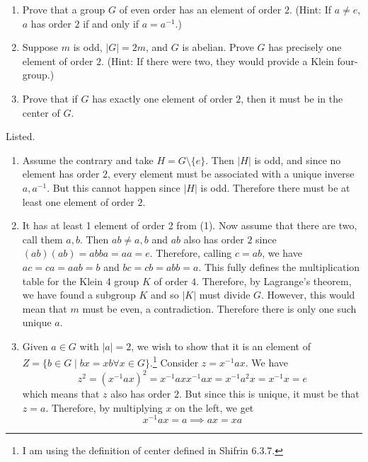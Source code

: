   \begin{exercise}[Shifrin 6.3.17]
    \begin{enumerate}
      \item Prove that a group $G$ of even order has an element of order $2$. (Hint: If $a \neq e$, $a$ has order $2$ if and only if $a = a^{-1}$.)
      \item Suppose $m$ is odd, $|G| = 2m$, and $G$ is abelian. Prove $G$ has precisely one element of order $2$. (Hint: If there were two, they would provide a Klein four-group.)
      \item Prove that if $G$ has exactly one element of order $2$, then it must be in the center of $G$.
    \end{enumerate}
  \end{exercise}
  \begin{solution}
    Listed. 
    \begin{enumerate}
      \item Assume the contrary and take $H = G \setminus \{e\}$. Then $|H|$ is odd, and since no element has order $2$, every element must be associated with a unique inverse $a, a^{-1}$. But this cannot happen since $|H|$ is odd. Therefore there must be at least one element of order $2$. 

      \item It has at least 1 element of order 2 from (1). Now assume that there are two, call them $a, b$. Then $ab \neq a, b$ and $ab$ also has order $2$ since $(ab)(ab) = abba = aa = e$. Therefore, calling $c = ab$, we have $ac = ca = aab = b$ and $bc = cb = abb = a$. This fully defines the multiplication table for the Klein 4 group $K$ of order $4$. Therefore, by Lagrange's theorem, we have found a subgroup $K$ and so $|K|$ must divide $G$. However, this would mean that $m$ must be even, a contradiction. Therefore there is only one such unique $a$. 

      \item Given $a \in G$ with $|a| = 2$, we wish to show that it is an element of $Z = \{ b \in G \mid bx = xb \forall x \in G\}$.\footnote{I am using the definition of center defined in Shifrin 6.3.7.} Consider $z = x^{-1} a x$. We have 
      \begin{equation}
        z^2 = (x^{-1} a x)^2 = x^{-1} a x x^{-1} a x = x^{-1} a^2 x = x^{-1} x = e
      \end{equation}
      which means that $z$ also has order $2$. But since this is unique, it must be that $z = a$. Therefore, by multiplying $x$ on the left, we get 
      \begin{equation}
        x^{-1} a x = a \implies ax = xa
      \end{equation}
    \end{enumerate}
  \end{solution}
  
